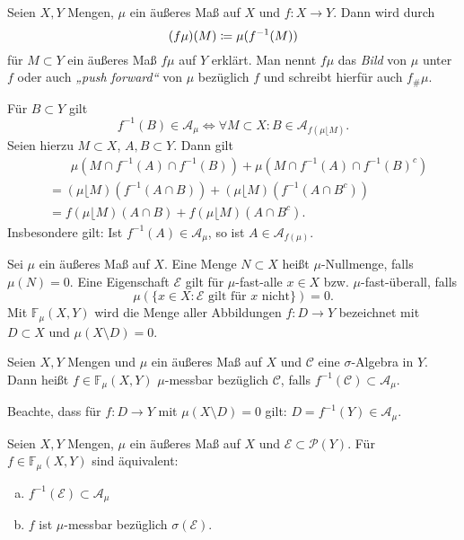 \documentclass[a4paper,twoside,DIV15,BCOR12mm]{scrbook}
\newcommand{\A}{\mathcal A}
\newcommand{\MR}{\lfloor}
\begin{document}
\begin{definition}
Seien $X,Y$ Mengen, $\mu$ ein äußeres Maß auf $X$ und $f:X\to Y$. Dann wird durch
\[
(f\mu)(M) \da \mu(f^{-1}(M))
\]
für $M\subset Y$ ein äußeres Maß $f\mu$ auf $Y$ erklärt. Man nennt $f\mu$ das \emph{Bild} von $\mu$ unter $f$ oder auch \emph{„push forward“} von $\mu$ bezüglich $f$ und schreibt hierfür auch $f_\#\mu$.
\end{definition}

\begin{bemerkung}
Für $B\subset Y$ gilt
\[
f^{-1}(B) \in \A_\mu \iff \forall M\subset X: B \in \A_{f(\mu \MR M)}.
\]
Seien hierzu $M\subset X$, $A,B\subset Y$. Dann gilt
\begin{align*}
&\phantom{=\ \ }\mu(M\cap f^{-1}(A) \cap f^{-1}(B)) + \mu(M\cap f^{-1}(A) \cap f^{-1}(B)^c) \\
&= (\mu \MR M)(f^{-1}(A\cap B)) + (\mu \MR M)(f^{-1}(A\cap B^c)) \\
&= f(\mu \MR M)(A\cap B) + f(\mu \MR M) (A\cap B^c).
\end{align*}
Insbesondere gilt: Ist $f^{-1}(A) \in \A_\mu$, so ist $A\in\A_{f(\mu)}$.
\end{bemerkung}

\begin{sprechweisen}
Sei $\mu$ ein äußeres Maß auf $X$. Eine Menge $N\subset X$ heißt $\mu$-Nullmenge, falls $\mu(N)=0$. Eine Eigenschaft $\mathcal E$ gilt für $\mu$-fast-alle $x\in X$ bzw. $\mu$-fast-überall, falls 
\[
\mu(\{x\in X : \mathcal E\text{ gilt für $x$ nicht}\}) = 0.
\]
Mit $\mathbb F_\mu(X,Y)$ wird die Menge aller Abbildungen $f:D\to Y$ bezeichnet mit $D\subset X$ und $\mu(X\setminus D) = 0$.
\end{sprechweisen}

\begin{definition}
Seien $X,Y$ Mengen und $\mu$ ein äußeres Maß auf $X$ und $\mathcal C$ eine $\sigma$-Algebra in $Y$. Dann heißt $f\in\mathbb F_\mu(X,Y)$ $\mu$-messbar bezüglich $\mathcal C$, falls $f^{-1}(\mathcal C)\subset \A_\mu$.
\end{definition}

Beachte, dass für $f:D\to Y$ mit $\mu(X\setminus D)=0$ gilt: $D=f^{-1}(Y)\in \A_\mu$.

\begin{lemma}
Seien $X,Y$ Mengen, $\mu$ ein äußeres Maß auf $X$ und $\mathcal E\subset \mathcal P(Y)$.  Für $f\in\mathbb F_\mu(X,Y)$ sind äquivalent:
\begin{enumerate}[a)]
\item $f^{-1}(\mathcal E) \subset \A_\mu$
\item $f$ ist $\mu$-messbar bezüglich $\sigma(\mathcal E)$.
\end{enumerate}
\end{lemma}
\end{document}
